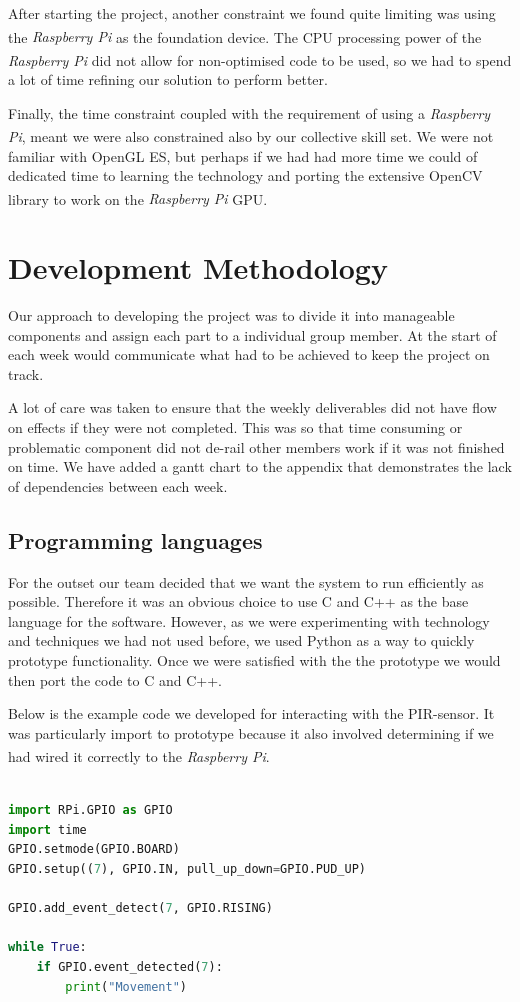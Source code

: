 \documentclass[11pt,a4paper,titlepage]{report}
\newcommand{\rpi}{\textit{Raspberry Pi\textsuperscript{\textregistered}}}
\begin{document}
After starting the project, another constraint we found quite limiting was using the \rpi\xspace as the foundation device. The CPU processing power of the \rpi\xspace did not allow for non-optimised code to be used, so we had to spend a lot of time refining our solution to perform better. 

Finally, the time constraint coupled with the requirement of using a \rpi, meant we were also constrained also by our collective skill set. We were not familiar with OpenGL ES, but perhaps if we had had more time we could of dedicated time to learning the technology and porting the extensive OpenCV library to work on the \rpi\xspace GPU. 


\section{Development Methodology}

Our approach to developing the project was to divide it into manageable components and assign each part to a individual group member. At the start of each week would communicate what had to be achieved to keep the project on track. 

A lot of care was taken to ensure that the weekly deliverables did not have flow on effects if they were not completed. This was so that time consuming or problematic component did not de-rail other members work if it was not finished on time. We have added a gantt chart to the appendix that demonstrates the lack of dependencies between each week.

\subsection{Programming languages}

For the outset our team decided that we want the system to run efficiently as possible. Therefore it was an obvious choice to use C and C++ as the base language for the software. However, as we were experimenting with technology and techniques we had not used before, we used Python as a way to quickly prototype functionality. Once we were satisfied with the the prototype we would then port the code to C and C++.

Below is the example code we developed for interacting with the PIR-sensor. It was particularly import to prototype because it also involved determining if we had wired it correctly to the \rpi.

\begin{lstlisting}[caption={Python code for interacting with the PIR-sensor},label=pir-sensor-test.py,language=python]

import RPi.GPIO as GPIO
import time
GPIO.setmode(GPIO.BOARD)
GPIO.setup((7), GPIO.IN, pull_up_down=GPIO.PUD_UP)

GPIO.add_event_detect(7, GPIO.RISING)

while True:
    if GPIO.event_detected(7):
        print("Movement")
\end{lstlisting}
\end{document}
